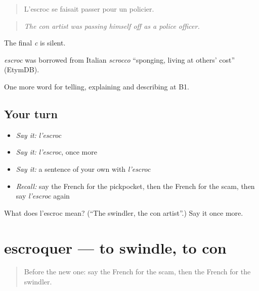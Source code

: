 \begin{quote}
L'escroc se faisait passer pour un policier.
\end{quote}

\begin{quote}
\emph{The con artist was passing himself off as a police officer.}
\end{quote}

The final \emph{c} is silent.

\begin{cousinweb}
\emph{escroc} was borrowed from Italian \emph{scrocco} \textquotedblleft{}sponging, living at others' cost\textquotedblright{} (EtymDB).
\end{cousinweb}

\begin{grammarlens}[title={What you've built}]
One more word for telling, explaining and describing at B1.
\end{grammarlens}

\subsection*{Your turn}
\begin{itemize}
\raggedright
  \item \emph{Say it:} \emph{l'escroc}
  \item \emph{Say it:} \emph{l'escroc}, once more
  \item \emph{Say it:} a sentence of your own with \emph{l'escroc}
  \item \emph{Recall:} say the French for the pickpocket, then the French for the scam, then say \emph{l'escroc} again
\end{itemize}

\begin{tcolorbox}[breakable,colback=teal!4,colframe=teal!35!black,title={Before you move on}]
What does l'escroc mean? (\textquotedblleft{}The swindler, the con artist\textquotedblright{}.) Say it once more.
\end{tcolorbox}
\section[escroquer]{escroquer — to swindle, to con}

\label{lesson:FR-C288-escroquer}



\begin{quote}
Before the new one: say the French for the scam, then the French for the swindler.
\end{quote}

